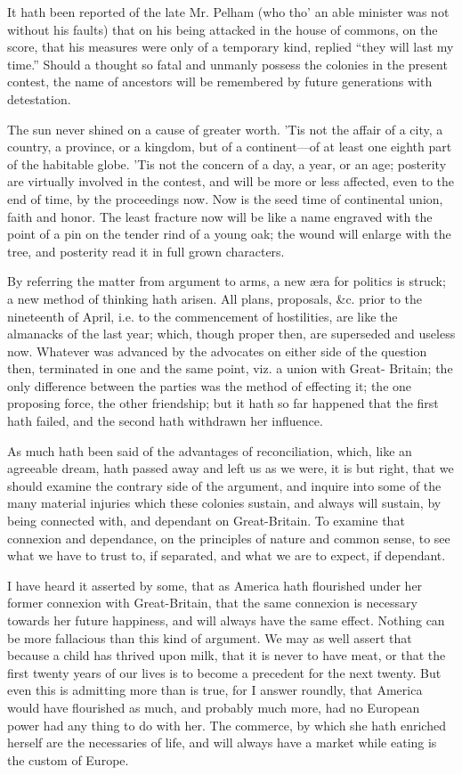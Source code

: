 \documentclass[12pt,oneside]{memoir}
\begin{document}
It hath been reported of the late Mr. Pelham (who tho' an able minister was not without his faults) that on his being attacked in the house of commons, on the score, that his measures were only of a temporary kind, replied ``they will last my time.'' Should a thought so fatal and unmanly possess the colonies in the present contest, the name of ancestors will be remembered by future generations with detestation.

The sun never shined on a cause of greater worth. 'Tis not the affair of a city, a country, a province, or a kingdom, but of a continent---of at least one eighth part of the habitable globe. 'Tis not the concern of a day, a year, or an age; posterity are virtually involved in the contest, and will be more or less affected, even to the end of time, by the proceedings now. Now is the seed time of continental union, faith and honor. The least fracture now will be like a name engraved with the point of a pin on the tender rind of a young oak; the wound will enlarge with the tree, and posterity read it in full grown characters.

By referring the matter from argument to arms, a new æra for politics is struck; a new method of thinking hath arisen. All plans, proposals, \&c. prior to the nineteenth of April, i.e. to the commencement of hostilities, are like the almanacks of the last year; which, though proper then, are superseded and useless now. Whatever was advanced by the advocates on either side of the question then, terminated in one and the same point, viz. a union with Great- Britain; the only difference between the parties was the method of effecting it; the one proposing force, the other friendship; but it hath so far happened that the first hath failed, and the second hath withdrawn her influence.

As much hath been said of the advantages of reconciliation, which, like an agreeable dream, hath passed away and left us as we were, it is but right, that we should examine the contrary side of the argument, and inquire into some of the many material injuries which these colonies sustain, and always will sustain, by being connected with, and dependant on Great-Britain. To examine that connexion and dependance, on the principles of nature and common sense, to see what we have to trust to, if separated, and what we are to expect, if dependant.

I have heard it asserted by some, that as America hath flourished under her former connexion with Great-Britain, that the same connexion is necessary towards her future happiness, and will always have the same effect. Nothing can be more fallacious than this kind of argument. We may as well assert that because a child has thrived upon milk, that it is never to have meat, or that the first twenty years of our lives is to become a precedent for the next twenty. But even this is admitting more than is true, for I answer roundly, that America would have flourished as much, and probably much more, had no European power had any thing to do with her. The commerce, by which she hath enriched herself are the necessaries of life, and will always have a market while eating is the custom of Europe.
\end{document}
